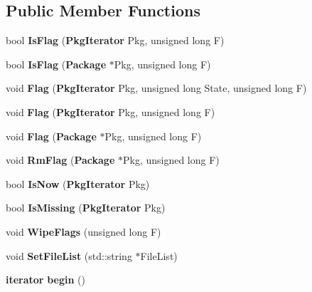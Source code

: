 \subsection*{\-Public \-Member \-Functions}
\begin{DoxyCompactItemize}
\item 
bool {\bfseries \-Is\-Flag} ({\bf \-Pkg\-Iterator} \-Pkg, unsigned long \-F)\label{classpkgOrderList_a673c11f9687b42a11d493976253a1ad1}

\item 
bool {\bfseries \-Is\-Flag} ({\bf \-Package} $\ast$\-Pkg, unsigned long \-F)\label{classpkgOrderList_a616e30d190ae035880a88ab4d4dd52a1}

\item 
void {\bfseries \-Flag} ({\bf \-Pkg\-Iterator} \-Pkg, unsigned long \-State, unsigned long \-F)\label{classpkgOrderList_a583928a8e9ac5227a5f87367328c8987}

\item 
void {\bfseries \-Flag} ({\bf \-Pkg\-Iterator} \-Pkg, unsigned long \-F)\label{classpkgOrderList_a21df44d9c5fceec0b133f5e2e9a60ab5}

\item 
void {\bfseries \-Flag} ({\bf \-Package} $\ast$\-Pkg, unsigned long \-F)\label{classpkgOrderList_a5e3f69c82fed1a9c904b3822ce510a8f}

\item 
void {\bfseries \-Rm\-Flag} ({\bf \-Package} $\ast$\-Pkg, unsigned long \-F)\label{classpkgOrderList_aa4204a8612c3a251d5c87566341dd44a}

\item 
bool {\bfseries \-Is\-Now} ({\bf \-Pkg\-Iterator} \-Pkg)\label{classpkgOrderList_a3e1d15bda9178dd80e3d6d7583d46ec3}

\item 
bool {\bfseries \-Is\-Missing} ({\bf \-Pkg\-Iterator} \-Pkg)\label{classpkgOrderList_a94c9b85c17f92d9a8b3a9cca67483ac7}

\item 
void {\bfseries \-Wipe\-Flags} (unsigned long \-F)\label{classpkgOrderList_a33428387c6dc1a3a10416483136dc755}

\item 
void {\bfseries \-Set\-File\-List} (std\-::string $\ast$\-File\-List)\label{classpkgOrderList_aeb8f8069927007050565cd985eeecdd5}

\item 
{\bf iterator} {\bfseries begin} ()\label{classpkgOrderList_ad69bd11391be1a1dba5c8202259664f8}


\end{DoxyCompactItemize}
